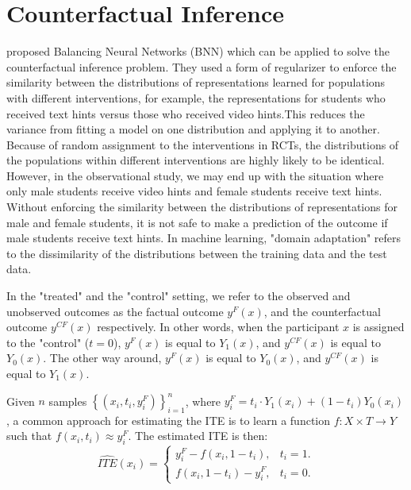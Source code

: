 \documentclass{article}
\begin{document}
\section{Counterfactual Inference}
\cite{Johansson2016-dh} proposed Balancing Neural Networks (BNN) which
can be applied to solve the counterfactual inference problem. They
used a form of regularizer to enforce the similarity between the
distributions of representations learned for populations with
different interventions, for example, the representations for students
who received text hints versus those who received video hints.This
reduces the variance from fitting a model on one distribution and
applying it to another. Because of random assignment to the
interventions in RCTs, the distributions of the populations within
different interventions are highly likely to be identical. However, in
the observational study, we may end up with the situation where only
male students receive video hints and female students receive text
hints. Without enforcing the similarity between the distributions of
representations for male and female students, it is not safe to make a
prediction of the outcome if male students receive text hints. In
machine learning, "domain adaptation" refers to the dissimilarity of
the distributions between the training data and the test data.

In the "treated" and the "control" setting, we refer to the observed and unobserved outcomes as the factual outcome $y^F(x)$, and the counterfactual outcome $y^{CF}(x)$ respectively. In other words, when the participant $x$ is assigned to the "control" ($t = 0$), $y^F(x)$ is equal to $Y_1(x)$, and $y^{CF}(x)$ is equal to $Y_0(x)$. The other way around, $y^F(x)$ is equal to $Y_0(x)$, and $y^{CF}(x)$ is equal to $Y_1(x)$.

Given $n$ samples $\left \{ (x_i, t_i, y_i^F) \right \}_{i=1}^n$, where $y_i^F = t_i \cdot Y_1(x_i) + (1-t_i)Y_0(x_i)$, a common approach for estimating the ITE is to learn a function $f : X \times T \rightarrow Y$ such that $f(x_i, t_i) \approx y_i^F$. The estimated ITE is then:
$$\hat{ITE}(x_i) = \left\{\begin{matrix} y_i^F - f(x_i, 1-t_i), & t_i = 1.\\ f(x_i, 1-t_i) - y_i^F, & t_i = 0. \end{matrix}\right. $$
\end{document}
